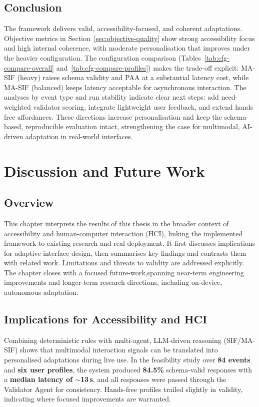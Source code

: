\documentclass[openany]{book}
\begin{document}
\section{Conclusion}
The framework delivers valid, accessibility-focused, and coherent adaptations. Objective metrics in Section~\ref{sec:objective-quality} show strong accessibility focus and high internal coherence, with moderate personalisation that improves under the heavier configuration. The configuration comparison (Tables~\ref{tab:cfg-compare-overall} and~\ref{tab:cfg-compare-profiles}) makes the trade-off explicit: MA-SIF (heavy) raises schema validity and PAA at a substantial latency cost, while MA-SIF (balanced) keeps latency acceptable for asynchronous interaction. The analyses by event type and run stability indicate clear next steps: add need-weighted validator scoring, integrate lightweight user feedback, and extend hands free affordances. These directions increase personalisation and keep the schema-based, reproducible evaluation intact, strengthening the case for multimodal, AI-driven adaptation in real-world interfaces.


\chapter{Discussion and Future Work}
\label{ch:chapter7}
\section{Overview}
This chapter interprets the results of this thesis in the broader context of accessibility and human-computer interaction (HCI), linking the implemented framework to existing research and real deployment. It first discusses implications for adaptive interface design, then summarises key findings and contrasts them with related work. Limitations and threats to validity are addressed explicitly. The chapter closes with a focused future-work,spanning near-term engineering improvements and longer-term research directions, including on-device, autonomous adaptation.

\section{Implications for Accessibility and HCI}
Combining deterministic rules with multi-agent, LLM-driven reasoning (SIF/MA-SIF) shows that multimodal interaction signals can be translated into personalised adaptations during live use. In the feasibility study over \textbf{84 events} and \textbf{six user profiles}, the system produced \textbf{84.5\%} schema-valid responses with a \textbf{median latency of $\sim$13\,s}, and all responses were passed through the Validator Agent for consistency. Hands-free profiles trailed slightly in validity, indicating where focused improvements are warranted.
\end{document}
